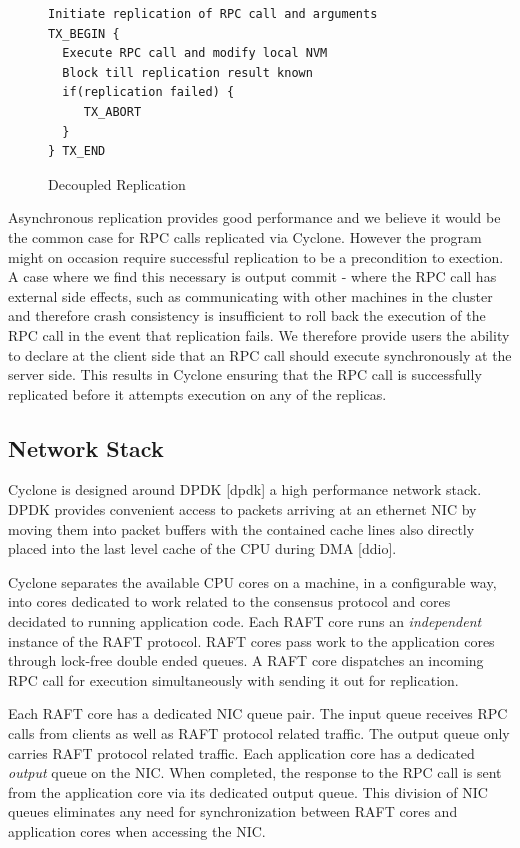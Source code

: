 \documentclass[letterpaper,twocolumn,10pt]{article}
\begin{document}
\begin{figure}
{ \scriptsize
\begin{verbatim}
Initiate replication of RPC call and arguments 
TX_BEGIN { 
  Execute RPC call and modify local NVM 
  Block till replication result known 
  if(replication failed) {
     TX_ABORT 
  } 
} TX_END
\end{verbatim}
}
\caption{Decoupled Replication}
\label{fig:async_rep}
\end{figure}

Asynchronous replication provides good performance and we believe it would be the
common case for RPC calls replicated via Cyclone. However the program might on
occasion require successful replication to be a precondition to exection. A case
where we find this necessary is output commit - where the RPC call has external
side effects, such as communicating with other machines in the cluster and
therefore crash consistency is insufficient to roll back the execution of the
RPC call in the event that replication fails. We therefore provide users the
ability to declare at the client side that an RPC call should execute
synchronously at the server side. This results in Cyclone ensuring that the RPC
call is successfully replicated before it attempts execution on any of the
replicas.

\subsection{Network Stack}
Cyclone is designed around DPDK [dpdk] a high performance network stack. DPDK
provides convenient access to packets arriving at an ethernet NIC by moving them
into packet buffers with the contained cache lines also directly placed into the
last level cache of the CPU during DMA [ddio].

Cyclone separates the available CPU cores on a machine, in a configurable way,
into cores dedicated to work related to the consensus protocol and cores
decidated to running application code. Each RAFT core runs an \emph{independent}
instance of the RAFT protocol. RAFT cores pass work to the application cores
through lock-free double ended queues. A RAFT core dispatches an incoming RPC
call for execution simultaneously with sending it out for replication.

Each RAFT core has a dedicated NIC queue pair. The input queue receives RPC
calls from clients as well as RAFT protocol related traffic. The output queue
only carries RAFT protocol related traffic. Each application core has a
dedicated \emph{output} queue on the NIC. When completed, the response to the
RPC call is sent from the application core via its dedicated output queue. This
division of NIC queues eliminates any need for synchronization between RAFT
cores and application cores when accessing the NIC.
\end{document}
